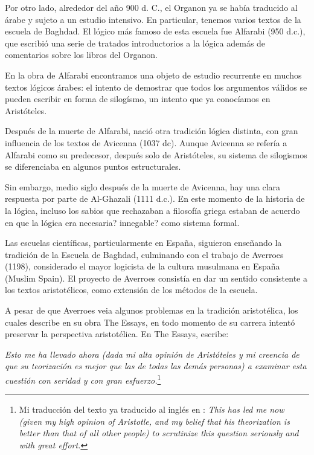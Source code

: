 \documentclass{article}
\begin{document}
Por otro lado, alrededor del año 900 d. C., el Organon ya se había traducido al árabe y sujeto a un estudio intensivo. En particular, tenemos varios textos de la escuela de Baghdad. El lógico más famoso de esta escuela fue Alfarabi (950 d.c.), que escribió una serie de tratados introductorios a la lógica además de comentarios sobre los libros del Organon.

En la obra de Alfarabi encontramos una objeto de estudio recurrente en muchos textos lógicos árabes: el intento de demostrar que todos los argumentos válidos se pueden escribir en forma de silogísmo, un intento que ya conocíamos en Aristóteles.

Después de la muerte de Alfarabi, nació otra tradición lógica distinta, con gran influencia de los textos de Avicenna (1037 dc). Aunque Avicenna se refería a Alfarabi como su predecesor, después solo de Aristóteles, su sistema de silogismos se diferenciaba en algunos puntos estructurales.

Sin embargo, medio siglo después de la muerte de Avicenna, hay una clara respuesta por parte de Al-Ghazali (1111 d.c.). En este momento de la historia de la lógica, incluso los sabios que rechazaban a filosofía griega estaban de acuerdo en que la lógica era necesaria? innegable? como sistema formal.

Las escuelas científicas, particularmente en España, siguieron enseñando la tradición de la Escuela de Baghdad, culminando con el trabajo de Averroes (1198), considerado el mayor logicista de la cultura musulmana en España (Muslim Spain). El proyecto de Averroes consistía en dar un sentido consistente a los textos aristotélicos, como extensión de los métodos de la escuela.

A pesar de que Averroes veia algunos problemas en la tradición aristotélica, los cuales describe en su obra The Essays, en todo momento de su carrera intentó preservar la perspectiva aristotélica\cite{street2001arabic}. En The Essays, escribe:

\begin{displayquote}
     \textit{Esto me ha llevado ahora (dada mi alta opinión de Aristóteles y mi creencia de que su teorización es mejor que las de todas las demás personas) a examinar esta cuestión con seridad y con gran esfuerzo.}\footnote{Mi traducción del texto ya traducido al inglés en \cite{street2001arabic}: \textit{This has led me now
    (given my high opinion of Aristotle, and my belief that his theorization is better than that of all other people) to scrutinize this question seriously and
    with great effort.}}
\end{displayquote}
\end{document}
